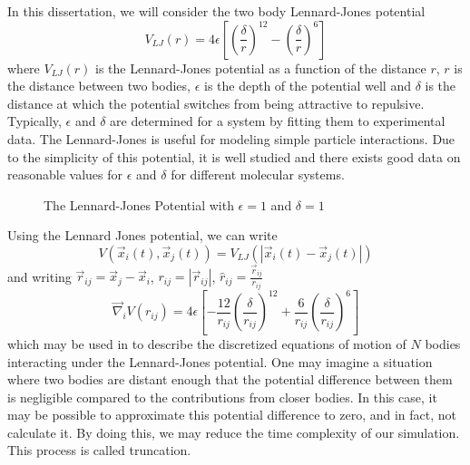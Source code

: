 %
In this dissertation, we will consider the two body Lennard-Jones potential
\begin{equation}
    V_{LJ}(r) = 4\epsilon \left[
        \left( \frac{\delta}{r} \right)^{12}
        - \left( \frac{\delta}{r} \right)^{6}
    \right]
\end  {equation}
where $V_{LJ}(r)$ is the Lennard-Jones potential as
a function of the distance $r$,
$r$ is the distance between two bodies,
$\epsilon$ is the depth of the potential well and
$\delta$ is the distance at which
the potential switches from being attractive to repulsive.
Typically, $\epsilon$ and $\delta$ are determined for a system by
fitting them to experimental data.
%
The Lennard-Jones is useful for modeling simple particle interactions.
%
Due to the simplicity of this potential,
it is well studied and there exists good data on
reasonable values for $\epsilon$ and $\delta$ for
different molecular systems.
%
\begin{figure}
    
    \caption{The Lennard-Jones Potential with $\epsilon = 1$ and $\delta = 1$}
\end  {figure}

%
Using the Lennard Jones potential, we can write
\begin{equation}
    V(\vec{x}_i(t), \vec{x}_j(t)) = V_{LJ}(|\vec{x}_i(t) - \vec{x}_j(t)|)
\end  {equation}
and writing $\vec{r}_{ij} = \vec{x}_j - \vec{x}_i$,
$r_{ij} = |\vec{r}_{ij}|$, $\hat{r}_{ij} = \frac{\vec{r}_{ij}}{r_{ij}}$
\begin{equation}
    \vec{\nabla}_i V(r_{ij}) = 4\epsilon \left[
        - \frac{12}{r_{ij}} \left( \frac{\delta}{r_{ij}} \right)^{12}
        + \frac{6}{r_{ij}} \left( \frac{\delta}{r_{ij}} \right)^{6}
    \right]
\end  {equation}
which may be used in  to describe
the discretized equations of motion of $N$ bodies interacting under the
Lennard-Jones potential.
%
One may imagine a situation where two bodies are distant enough
that the potential difference between them is negligible compared
to the contributions from closer bodies.
%
In this case, it may be possible to approximate this potential difference
to zero, and in fact, not calculate it.
%
By doing this, we may reduce the time complexity of our simulation.
%
This process is called truncation.


